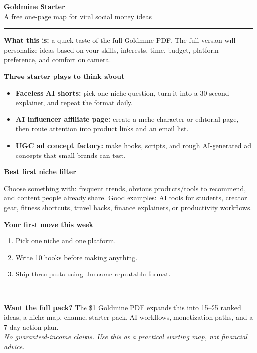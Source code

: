 \documentclass[11pt]{article}
\begin{document}
{\Huge \bfseries Goldmine Starter}\\[4pt]
{\large A free one-page map for viral social money ideas}\\[10pt]
\textcolor{gold}{\rule{\linewidth}{1.2pt}}

\vspace{10pt}
\textbf{What this is:} a quick taste of the full Goldmine PDF. The full version will personalize ideas based on your skills, interests, time, budget, platform preference, and comfort on camera.

\vspace{10pt}
\textbf{Three starter plays to think about}
\begin{itemize}
  \item \textbf{Faceless AI shorts:} pick one niche question, turn it into a 30-second explainer, and repeat the format daily.
  \item \textbf{AI influencer affiliate page:} create a niche character or editorial page, then route attention into product links and an email list.
  \item \textbf{UGC ad concept factory:} make hooks, scripts, and rough AI-generated ad concepts that small brands can test.
\end{itemize}

\vspace{6pt}
\textbf{Best first niche filter}

Choose something with: frequent trends, obvious products/tools to recommend, and content people already share. Good examples: AI tools for students, creator gear, fitness shortcuts, travel hacks, finance explainers, or productivity workflows.

\vspace{10pt}
\textbf{Your first move this week}
\begin{enumerate}[leftmargin=16pt,itemsep=4pt,topsep=5pt]
  \item Pick one niche and one platform.
  \item Write 10 hooks before making anything.
  \item Ship three posts using the same repeatable format.
\end{enumerate}

\vfill
\textcolor{gold}{\rule{\linewidth}{0.8pt}}\\[6pt]
\textbf{Want the full pack?} The \$1 Goldmine PDF expands this into 15--25 ranked ideas, a niche map, channel starter pack, AI workflows, monetization paths, and a 7-day action plan.\\
\textit{No guaranteed-income claims. Use this as a practical starting map, not financial advice.}
\end{document}
